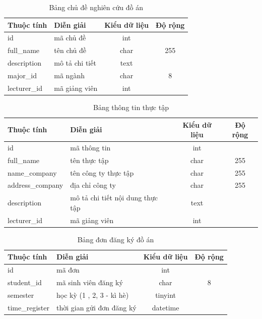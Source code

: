     \begin{table}[h!]
      \centering
      \begin{tabular}{|l|p{}|c|c|}
        \hline
        \textbf{Thuộc tính} & \textbf{Diễn giải} & \textbf{Kiểu dữ liệu} & \textbf{Độ rộng} \\
        \hline
        id & mã chủ đề & int &  \\
        \hline
        full\_name & tên chủ đề & char & 255\\
        \hline
        description & mô tả chi tiết & text & \\
        \hline
        major\_id & mã ngành & char & 8\\
        \hline
        lecturer\_id & mã giảng viên & int & \\
        \hline
      \end{tabular}
      \caption{Bảng chủ đề nghiên cứu đồ án}
    \end{table}

    \begin{table}[h!]
      \centering
      \begin{tabular}{|l|p{}|c|c|}
        \hline
        \textbf{Thuộc tính} & \textbf{Diễn giải} & \textbf{Kiểu dữ liệu} & \textbf{Độ rộng} \\
        \hline
        id & mã thông tin & int &  \\
        \hline
        full\_name & tên thực tập & char & 255\\
        \hline
        name\_company & tên công ty thực tập & char & 255\\
        \hline
        address\_company & địa chỉ công ty & char & 255\\
        \hline
        description & mô tả chi tiết nội dung thực tập & text & \\
        \hline
        lecturer\_id & mã giảng viên & int & \\
        \hline
      \end{tabular}
      \caption{Bảng thông tin thực tập}
    \end{table}

    \begin{table}[h!]
      \centering
      \begin{tabular}{|l|p{}|c|c|}
        \hline
        \textbf{Thuộc tính} & \textbf{Diễn giải} & \textbf{Kiểu dữ liệu} & \textbf{Độ rộng} \\
        \hline
        id & mã đơn & int &  \\
        \hline
        student\_id & mã sinh viên đăng ký & char & 8\\
        \hline
        semester & học kỳ (1 , 2, 3 - kì hè) & tinyint & \\
        \hline
        time\_register & thời gian gửi đơn đăng ký & datetime & \\
        \hline
      \end{tabular}
      \caption{Bảng đơn đăng ký đồ án}
    \end{table}

